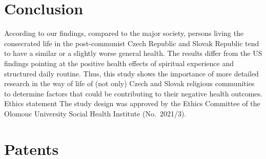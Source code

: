 \documentclass[ijerph,article,accept,moreauthors,pdftex]{mdpi}
\begin{document}
\hypertarget{conclusion}{%
\section{Conclusion}\label{conclusion}}

According to our findings, compared to the major society, persons living
the consecrated life in the post-communist Czech Republic and Slovak
Republic tend to have a similar or a slightly worse general health. The
results differ from the US findings pointing at the positive health
effects of spiritual experience and structured daily routine. Thus, this
study shows the importance of more detailed research in the way of life
of (not only) Czech and Slovak religious communities to determine
factors that could be contributing to their negative health outcomes.
Ethics statement The study design was approved by the Ethics Committee
of the Olomouc University Social Health Institute (No.~2021/3).

\hypertarget{patents}{%
\section{Patents}\label{patents}}

%

\vspace{6pt}


\end{document}
